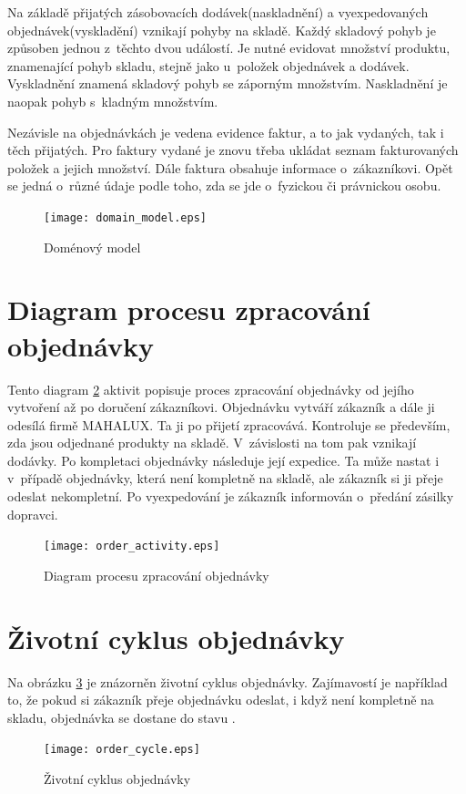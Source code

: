 \documentclass[thesis=B,czech]{FITthesis}[2012/06/26]
\begin{document}
	Na základě přijatých zásobovacích dodávek(naskladnění) a vyexpedovaných objednávek(vyskladění) vznikají pohyby na skladě. Každý skladový pohyb je způsoben jednou z~těchto dvou událostí. Je nutné evidovat množství produktu, znamenající pohyb skladu, stejně jako u~položek objednávek a dodávek. Vyskladnění znamená skladový pohyb se záporným množstvím. Naskladnění je naopak pohyb s~kladným množstvím.
	
	Nezávisle na objednávkách je vedena evidence faktur, a to jak vydaných, tak i těch přijatých. Pro faktury vydané je znovu třeba ukládat seznam fakturovaných položek a jejich množství. Dále faktura obsahuje informace o~zákazníkovi. Opět se jedná o~různé údaje podle toho, zda se jde o~fyzickou či právnickou osobu. 
	
\begin{figure}
	\texttt{[image: domain\_model.eps]}
	\caption{Doménový model}\label{domain_model}
\end{figure}

\section{Diagram procesu zpracování objednávky}
	Tento diagram \ref{order_activity} aktivit popisuje proces zpracování objednávky od jejího vytvoření až po doručení zákazníkovi. Objednávku vytváří zákazník a dále ji odesílá firmě MAHALUX. Ta ji po přijetí zpracovává. Kontroluje se především, zda jsou odjednané produkty na skladě. V~závislosti na tom pak vznikají dodávky. Po kompletaci objednávky následuje její expedice. Ta může nastat i v~případě objednávky, která není kompletně na skladě, ale zákazník si ji přeje odeslat nekompletní. Po vyexpedování je zákazník informován o~předání zásilky dopravci.

\begin{figure}
	\texttt{[image: order\_activity.eps]}
	\caption{Diagram procesu zpracování objednávky}\label{order_activity}
\end{figure}

\section{Životní cyklus objednávky}
	Na obrázku \ref{oredr_cycle} je znázorněn životní cyklus objednávky. Zajímavostí je například to, že pokud si zákazník přeje objednávku odeslat, i když není kompletně na skladu, objednávka se dostane do stavu . 
	
\begin{figure}
	\texttt{[image: order\_cycle.eps]}
	\caption{Životní cyklus objednávky}\label{oredr_cycle}
\end{figure}
\end{document}
